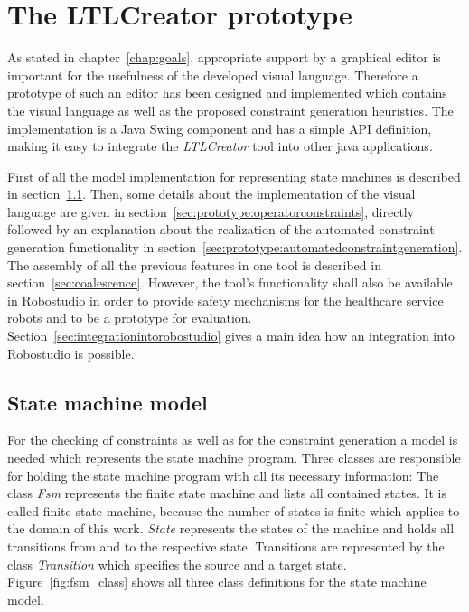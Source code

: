 \chapter{The LTLCreator prototype}
\label{chap:theltlcreatorprototype}

As stated in chapter~\ref{chap:goals}, appropriate support by a graphical editor is important for the usefulness of the developed visual language. Therefore a prototype of such an editor has been designed and implemented which contains the visual language as well as the proposed constraint generation heuristics. The implementation is a Java Swing component and has a simple API definition, making it easy to integrate the \emph{LTLCreator} tool into other java applications.

First of all the model implementation for representing state machines is described in section~\ref{sec:statemachinemodel}. Then, some details about the implementation of the visual language are given in section~\ref{sec:prototype:operatorconstraints}, directly followed by an explanation about the realization of the automated constraint generation functionality in section~\ref{sec:prototype:automatedconstraintgeneration}.
The assembly of all the previous features in one tool is described in section~\ref{sec:coalescence}. However, the tool's functionality shall also be available in Robostudio in order to provide safety mechanisms for the healthcare service robots and to be a prototype for evaluation. Section~\ref{sec:integrationintorobostudio} gives a main idea how an integration into Robostudio is possible. 


\section{State machine model}
\label{sec:statemachinemodel}

For the checking of constraints as well as for the constraint generation a model is needed which represents the state machine program. Three classes are responsible for holding the state machine program with all its necessary information: The class \emph{Fsm} represents the finite state machine and lists all contained states. It is called finite state machine, because the number of states is finite which applies to the domain of this work. \emph{State} represents the states of the machine and holds all transitions from and to the respective state. Transitions are represented by the class \emph{Transition} which specifies the source and a target state. Figure~\ref{fig:fsm_class} shows all three class definitions for the state machine model.


